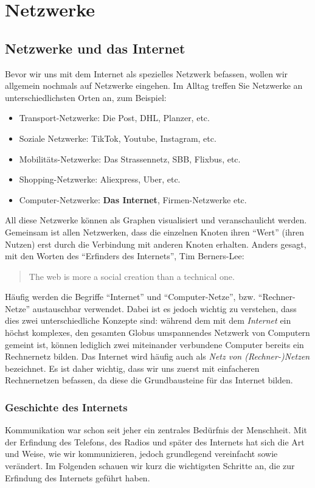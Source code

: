 \chapter{Netzwerke}

\section{Netzwerke und das Internet}
Bevor wir uns mit dem Internet als spezielles Netzwerk befassen, wollen wir allgemein nochmals auf Netzwerke eingehen. Im Alltag treffen Sie Netzwerke an unterschiedlichsten Orten an, zum Beispiel:
\begin{itemize}
	\item Transport-Netzwerke: Die Post, DHL, Planzer, etc.
	\item Soziale Netzwerke: TikTok, Youtube, Instagram, etc.
	\item Mobilitäts-Netzwerke: Das Strassennetz, SBB, Flixbus, etc.
	\item Shopping-Netzwerke: Aliexpress, Uber, etc.
	\item Computer-Netzwerke: \textbf{Das Internet}, Firmen-Netzwerke etc.
\end{itemize}

All diese Netzwerke können als Graphen visualisiert und veranschaulicht werden. Gemeinsam ist allen Netzwerken, dass die einzelnen Knoten ihren \enquote{Wert} (ihren Nutzen) erst durch die Verbindung mit anderen Knoten erhalten. Anders gesagt, mit den Worten des \enquote{Erfinders des Internets}, Tim Berners-Lee:

\begin{quotation}
	The web is more a social creation than a technical one.
\end{quotation}

Häufig werden die Begriffe \enquote{Internet} und \enquote{Computer-Netze}, bzw. \enquote{Rechner-Netze} austauschbar verwendet. Dabei ist es jedoch wichtig zu verstehen, dass dies zwei unterschiedliche Konzepte sind: während dem mit dem \textit{Internet} ein höchst komplexes, den gesamten Globus umspannendes Netzwerk von Computern gemeint ist, können lediglich zwei miteinander verbundene Computer bereits ein Rechnernetz bilden. Das Internet wird häufig auch als \textit{Netz von (Rechner-)Netzen} bezeichnet. Es ist daher wichtig, dass wir uns zuerst mit einfacheren Rechnernetzen befassen, da diese die Grundbausteine für das Internet bilden.

\subsection{Geschichte des Internets}
Kommunikation war schon seit jeher ein zentrales Bedürfnis der Menschheit. Mit der Erfindung des Telefons, des Radios und später des Internets hat sich die Art und Weise, wie wir kommunizieren, jedoch grundlegend vereinfacht sowie verändert. Im Folgenden schauen wir kurz die wichtigsten Schritte an, die zur Erfindung des Internets geführt haben.


